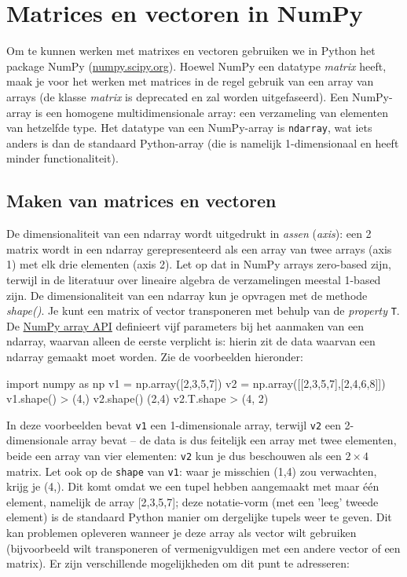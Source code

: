 
\section{Matrices en vectoren in NumPy}
Om te kunnen werken met matrixes en vectoren gebruiken we in Python het package NumPy (\url{numpy.scipy.org}). Hoewel NumPy een datatype \textit{matrix} heeft, maak je voor het werken met matrices in de regel gebruik van een array van arrays (de klasse \textit{matrix} is deprecated en zal worden uitgefaseerd). Een NumPy-array is een homogene multidimensionale array: een verzameling van elementen van hetzelfde type. Het datatype van een NumPy-array is \texttt{ndarray}, wat iets anders is dan de standaard Python-array (die is namelijk 1-dimensionaal en heeft minder functionaliteit).

\subsection{Maken van matrices en vectoren}
De dimensionaliteit van een ndarray wordt uitgedrukt in \textit{assen} (\textit{axis}): een 2  matrix wordt in een ndarray gerepresenteerd als een array van twee arrays (axis 1) met elk drie elementen (axis 2). Let op dat in NumPy arrays zero-based zijn, terwijl in de literatuur over lineaire algebra de verzamelingen meestal 1-based zijn. De dimensionaliteit van een ndarray kun je opvragen met de methode \textit{shape()}. Je kunt een matrix of vector transponeren met behulp van de \textit{property} \texttt{T}. De \href{https://docs.scipy.org/doc/numpy/reference/generated/numpy.array.html}{NumPy array API} definieert vijf parameters bij het aanmaken van een ndarray, waarvan alleen de eerste verplicht is: hierin zit de data waarvan een ndarray gemaakt moet worden. Zie de voorbeelden hieronder:

\begin{python}
import numpy as np
v1 = np.array([2,3,5,7])
v2 = np.array([[2,3,5,7],[2,4,6,8]])
v1.shape()
> (4,)
v2.shape()
(2,4)
v2.T.shape
> (4, 2)
\end{python}

In deze voorbeelden bevat \texttt{v1} een 1-dimensionale array, terwijl \texttt{v2} een 2-dimensionale array bevat – de data is dus feitelijk een array met twee elementen, beide een array van vier elementen: \texttt{v2} kun je dus beschouwen als een $2 \times 4$ matrix. Let ook op de \texttt{shape} van \texttt{v1}: waar je misschien (1,4) zou verwachten, krijg je (4,). Dit komt omdat we een tupel hebben aangemaakt met maar één element, namelijk de array [2,3,5,7]; deze notatie-vorm (met een 'leeg' tweede element) is de standaard Python manier om dergelijke tupels weer te geven. Dit kan problemen opleveren wanneer je deze array als vector wilt gebruiken (bijvoorbeeld wilt transponeren of vermenigvuldigen met een andere vector of een matrix). Er zijn verschillende mogelijkheden om dit punt te adresseren:

